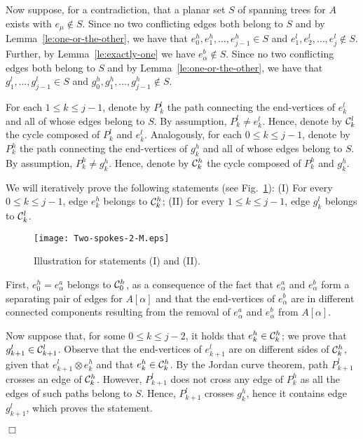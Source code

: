 \documentclass[letter,runningheads]{llncs}
\renewenvironment{proof}
{{\em Proof.\ }}{\hspace*{\fill}$\Box$\par\vspace{2mm}}
\newcommand{\conf}{\otimes}
\begin{document}
\begin{proof}
Now suppose, for a contradiction, that a planar set $S$ of spanning trees for $A$ exists with $e_{\mu} \notin S$. Since no two conflicting edges both belong to $S$ and by Lemma~\ref{le:one-or-the-other}, we have that $e^h_0,e^h_1,\dots,e^h_{j-1}\in S$ and $e^l_1,e^l_2,\dots,e^l_{j}\notin S$. Further, by Lemma~\ref{le:exactly-one} we have $e^b_{\alpha} \notin S$. Since no two conflicting edges both belong to $S$ and by Lemma~\ref{le:one-or-the-other}, we have that $g^l_1,\dots,g^l_{j-1}\in S$ and $g^h_0,g^h_1,\dots,g^h_{j-1}\notin S$.

For each $1\leq k\leq j-1$, denote by $P^l_k$ the path connecting the end-vertices of $e^l_k$ and all of whose edges belong to $S$. By assumption, $P^l_k\neq e^l_k$. Hence, denote by ${\cal C}^l_k$ the cycle composed of $P^l_k$ and $e^l_k$. Analogously, for each $0\leq k\leq j-1$, denote by $P^h_k$ the path connecting the end-vertices of $g^h_k$ and all of whose edges belong to $S$. By assumption, $P^h_k\neq g^h_k$. Hence, denote by ${\cal C}^h_k$ the cycle composed of $P^h_k$ and $g^h_k$.

We will iteratively prove the following statements (see  Fig.~\ref{fig:two-spokes-2}): (I) For every $0\leq k\leq j-1$, edge $e^h_k$ belongs to ${\cal C}^h_k$; (II) for every $1\leq k\leq j-1$, edge $g^l_k$ belongs to ${\cal C}^l_k$.

\begin{figure}[tb]
\begin{center}
\mbox{\texttt{[image: Two-spokes-2-M.eps]}}
\caption{Illustration for statements (I) and (II).}
\label{fig:two-spokes-2}
\end{center}
\end{figure}

First, $e^h_0=e^a_{\alpha}$ belongs to ${\cal C}^h_0$, as a consequence of the fact that $e^a_{\alpha}$ and $e^b_{\alpha}$ form a separating pair of edges for $A[\alpha]$ and that the end-vertices of $e^b_{\alpha}$ are in different connected components resulting from the removal of $e^a_{\alpha}$ and $e^b_{\alpha}$ from $A[\alpha]$.

Now suppose that, for some $0\leq k\leq j-2$, it holds that $e^h_k\in {\cal C}^h_k$; we prove that $g^l_{k+1}\in {\cal C}^l_{k+1}$. Observe that the end-vertices of $e^l_{k+1}$ are on different sides of ${\cal C}^h_k$, given that $e^l_{k+1}\conf e^h_k$ and that $e^h_k\in {\cal C}^h_k$. By the Jordan curve theorem, path $P^l_{k+1}$ crosses an edge of ${\cal C}^h_k$. However, $P^l_{k+1}$ does not cross any edge of $P^h_k$ as all the edges of such paths belong to $S$. Hence, $P^l_{k+1}$ crosses $g^h_k$, hence it contains edge $g^l_{k+1}$, which proves the statement.


\end{proof}
\end{document}
